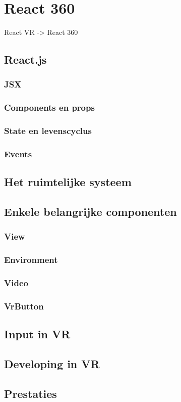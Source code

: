 \chapter{React 360}
\label{ch:react-360}

React VR -> React 360

\section{React.js}
\label{sec:reactjs}
\subsection{JSX}
\label{subsec:jsx}
\subsection{Components en props}
\label{subsec:components-en-props}
\subsection{State en levenscyclus}
\label{subsec:state-en-levenscyclus}
\subsection{Events}
\label{subsec:events}

\section{Het ruimtelijke systeem}
\label{sec:ruimtelijk-systeem}

\section{Enkele belangrijke componenten}
\label{sec:reactvr-componenten}
\subsection{View}
\label{subsec:view}
\subsection{Environment}
\subsection{Video}
\subsection{VrButton}

\section{Input in VR}
\label{sec:input-vr}

\section{Developing in VR}
\label{sec:developing-vr}

\section{Prestaties}
\label{sec:prestaties}
